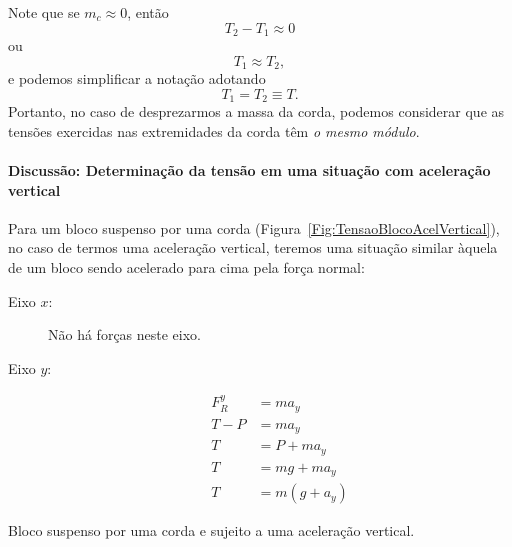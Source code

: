 %
Note que se $m_c \approx 0$, então
\begin{equation}
    T_2 - T_1 \approx 0
\end{equation}
%
ou
\begin{equation}
    T_1 \approx T_2,
\end{equation}
%
e podemos simplificar a notação adotando
\begin{equation}
    T_1 = T_2 \equiv T.
\end{equation}
%
Portanto, no caso de desprezarmos a massa da corda, podemos considerar que as tensões exercidas nas extremidades da corda têm \emph{o mesmo módulo}.

\paragraph{Discussão: Determinação da tensão em uma situação com aceleração vertical}

Para um bloco suspenso por uma corda (Figura~\ref{Fig:TensaoBlocoAcelVertical}), no caso de termos uma aceleração vertical, teremos uma situação similar àquela de um bloco sendo acelerado para cima pela força normal:
\begin{description}
    \item[Eixo $x$:] Não há forças neste eixo.
    \item[Eixo $y$:]
        \begin{align}
            F_R^y &= m a_y \\
            T - P &= m a_y \\
            T &= P + m a_y \\
            T &= mg + m a_y \\
            T &= m (g + a_y)
        \end{align}
\end{description}

\begin{marginfigure}[-3cm]
\centering
{}
\caption{Bloco suspenso por uma corda e sujeito a uma aceleração vertical. \label{Fig:TensaoBlocoAcelVertical}}
\end{marginfigure}

